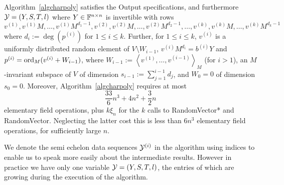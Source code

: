 \begin{Prop}
\label{propcharpoly}
%
Algorithm~\ref{algcharpoly} satisfies
the Output specifications, and furthermore
$\mathcal{Y}=(Y,S,T,l)$ where
$Y \in \mathbb{F}^{n \times n}$ is invertible with rows
\[ v\!^{(1)}, v\!^{(1)}M, \ldots, v\!^{(1)}M^{d_1-1}, 
v\!^{(2)}, v\!^{(2)}M, \ldots, v\!^{(2)}M^{d_2-1},
   \ldots, v\!^{(k)}, v\!^{(k)}M, \ldots, v\!^{(k)} M^{d_k-1} 
\]
where $d_i := \deg(p^{(i)})$ for $1 \le i \le k$. Further, for $1 \le i \le k$,
$v^{(i)}$ is a uniformly distributed random element of\/ $V\setminus W_{i-1}$, 
$v^{(i)} M^{d_i} = b^{(i)} Y$ and $p^{(i)} = \mathrm{ord}_M(v^{(i)} + W_{i-1})$,
where $W_{i-1} := \left< v^{(1)}, \ldots, v^{(i-1)}\right>_M$ (for $i>1$), 
an $M$-invariant subspace of $V$ of dimension $s_{i-1}:=\sum_{j=1}^{i-1} d_j$, and 
$W_0=0$ of dimension $s_0=0$.
Moreover, Algorithm~\ref{algcharpoly} requires at most
\[
\frac{33}{6}n^3+4n^2+\frac{3}{2}n 
\]
elementary field operations, plus
$k\xi_{n}$ for the $k$ calls to {\sc RandomVector*} and {\sc RandomVector}. Neglecting 
the latter cost this  is less than $6n^3$ elementary field operations, for sufficiently large $n$.
\end{Prop}

\begin{Rem}
We denote the semi echelon data sequences 
$\mathcal{Y}^{(i)}$ in the algorithm using indices to enable us to speak 
more easily about the intermediate results. However in practice
we have only one variable $\mathcal{Y}=(Y,S,T,l)$, the entries of which are 
growing during the execution of the algorithm.
\end{Rem}


